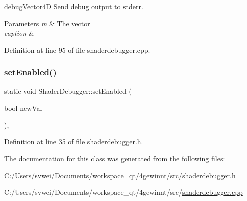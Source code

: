 debug\+Vector4D Send debug output to stderr. 


\begin{DoxyParams}{Parameters}
{\em m} & The vector \\
\hline
{\em caption} & \\
\hline
\end{DoxyParams}


Definition at line 95 of file shaderdebugger.\+cpp.

\mbox{\label{class_shader_debugger_af7f777abe3673cac6a93b301ef539913}} 
\subsubsection{\texorpdfstring{setEnabled()}{setEnabled()}}
{\footnotesize\ttfamily static void Shader\+Debugger\+::set\+Enabled (\begin{DoxyParamCaption}\item[{bool}]{new\+Val }\end{DoxyParamCaption})\hspace{0.3cm}{\ttfamily [inline]}, {\ttfamily [static]}}



Definition at line 35 of file shaderdebugger.\+h.



The documentation for this class was generated from the following files\+:\begin{DoxyCompactItemize}
\item 
C\+:/\+Users/svwei/\+Documents/workspace\+\_\+qt/4gewinnt/src/\mbox{\hyperlink{shaderdebugger_8h}{shaderdebugger.\+h}}\item 
C\+:/\+Users/svwei/\+Documents/workspace\+\_\+qt/4gewinnt/src/\mbox{\hyperlink{shaderdebugger_8cpp}{shaderdebugger.\+cpp}}\end{DoxyCompactItemize}
